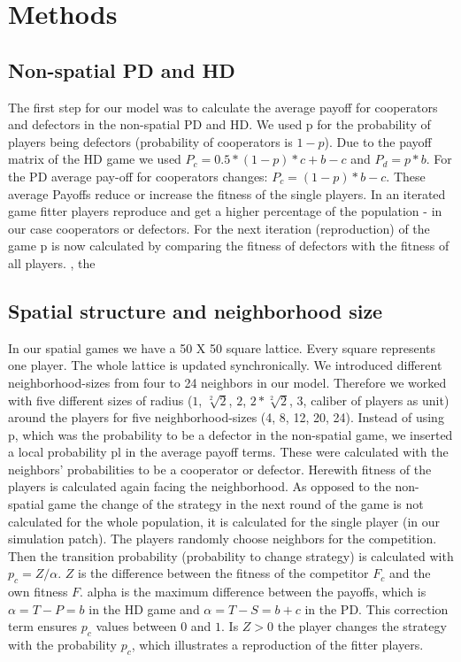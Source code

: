 \section{Methods}


\subsection{Non-spatial PD and HD}

The first step for our model was to calculate the average payoff for cooperators and defectors in the non-spatial PD and HD. We used p for the probability of players being defectors (probability of cooperators is $1-p$). Due to the payoff matrix of the HD game we used $P_{c}=0.5*(1-p)*c+b-c$ and $P_{d}=p*b$. For the PD average pay-off for cooperators changes: $P_{c}=(1-p)*b-c$. These average Payoffs reduce or increase the fitness of the single players. In an iterated game fitter players reproduce and get a higher percentage of the population - in our case cooperators or defectors. For the next iteration (reproduction) of the game p is now calculated by comparing the fitness of defectors with the fitness of all players.
, the 
\subsection{Spatial structure and neighborhood size}
In our spatial games we have a 50 X 50 square lattice. Every square represents one player. The whole lattice is updated synchronically. We introduced different neighborhood-sizes from four to 24 neighbors in our model. Therefore we worked with five different sizes of radius ($1$, $\sqrt[2]{2}$, $2$, $2*\sqrt[2]{2}$, $3$, caliber of players as unit) around the players for five neighborhood-sizes (4, 8, 12, 20, 24). Instead of using p, which was the probability to be a defector in the non-spatial game, we inserted a local probability pl in the average payoff terms. These were calculated with the neighbors' probabilities to be a cooperator or defector. Herewith fitness of the players is calculated again facing the neighborhood. As opposed to the non-spatial game the change of the strategy in the next round of the game is not calculated for the whole population, it is calculated for the single player (in our simulation patch). The players randomly choose neighbors for the competition. Then the transition probability (probability to change strategy) is calculated with $p_{c} = Z/\alpha$. $Z$ is the difference between the fitness of the competitor $F_c$ and the own fitness $F$. alpha is the maximum difference between the payoffs, which is $\alpha=T-P=b$ in the HD game and $\alpha=T-S=b+c$ in the PD. This correction term ensures $p_{c}$ values between $0$ and $1$. Is $Z>0$ the player changes the strategy with the probability $p_{c}$, which illustrates a reproduction of the fitter players.

